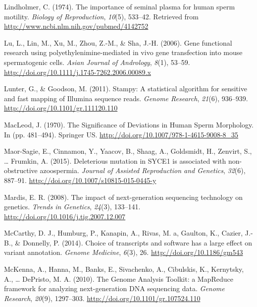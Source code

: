 \documentclass[12pt,twoside]{reedthesis}
\theoremstyle{definition}
\theoremstyle{definition}
\theoremstyle{remark}
\begin{document}
  \hypertarget{ref-Lindholmer1974}{}
  Lindholmer, C. (1974). The importance of seminal plasma for human sperm
  motility. \emph{Biology of Reproduction}, \emph{10}(5), 533--42.
  Retrieved from \url{http://www.ncbi.nlm.nih.gov/pubmed/4142752}
  
  \hypertarget{ref-Lu2006}{}
  Lu, L., Lin, M., Xu, M., Zhou, Z.-M., \& Sha, J.-H. (2006). Gene
  functional research using polyethylenimine-mediated in vivo gene
  transfection into mouse spermatogenic cells. \emph{Asian Journal of
  Andrology}, \emph{8}(1), 53--59.
  \url{http://doi.org/10.1111/j.1745-7262.2006.00089.x}
  
  \hypertarget{ref-Lunter2011}{}
  Lunter, G., \& Goodson, M. (2011). Stampy: A statistical algorithm for
  sensitive and fast mapping of Illumina sequence reads. \emph{Genome
  Research}, \emph{21}(6), 936--939.
  \url{http://doi.org/10.1101/gr.111120.110}
  
  \hypertarget{ref-MacLeod1970}{}
  MacLeod, J. (1970). The Significance of Deviations in Human Sperm
  Morphology. In (pp. 481--494). Springer US.
  \url{http://doi.org/10.1007/978-1-4615-9008-8_35}
  
  \hypertarget{ref-Maor-Sagie2015}{}
  Maor-Sagie, E., Cinnamon, Y., Yaacov, B., Shaag, A., Goldsmidt, H.,
  Zenvirt, S., \ldots{} Frumkin, A. (2015). Deleterious mutation in SYCE1
  is associated with non-obstructive azoospermia. \emph{Journal of
  Assisted Reproduction and Genetics}, \emph{32}(6), 887--91.
  \url{http://doi.org/10.1007/s10815-015-0445-y}
  
  \hypertarget{ref-Mardis2008}{}
  Mardis, E. R. (2008). The impact of next-generation sequencing
  technology on genetics. \emph{Trends in Genetics}, \emph{24}(3),
  133--141. \url{http://doi.org/10.1016/j.tig.2007.12.007}
  
  \hypertarget{ref-McCarthy2014}{}
  McCarthy, D. J., Humburg, P., Kanapin, A., Rivas, M. a, Gaulton, K.,
  Cazier, J.-B., \& Donnelly, P. (2014). Choice of transcripts and
  software has a large effect on variant annotation. \emph{Genome
  Medicine}, \emph{6}(3), 26. \url{http://doi.org/10.1186/gm543}
  
  \hypertarget{ref-McKenna2010}{}
  McKenna, A., Hanna, M., Banks, E., Sivachenko, A., Cibulskis, K.,
  Kernytsky, A., \ldots{} DePristo, M. A. (2010). The Genome Analysis
  Toolkit: a MapReduce framework for analyzing next-generation DNA
  sequencing data. \emph{Genome Research}, \emph{20}(9), 1297--303.
  \url{http://doi.org/10.1101/gr.107524.110}
  
\end{document}
